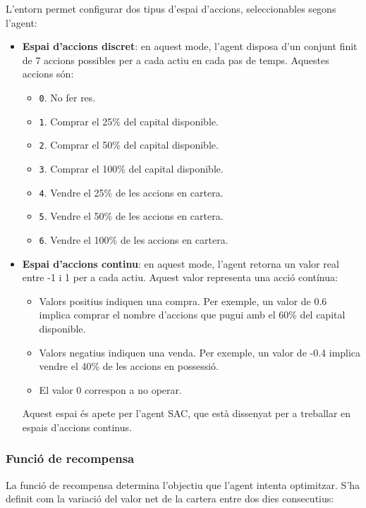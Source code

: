 \documentclass[12pt,a4paper,twoside]{book}
\begin{document}
L'entorn permet configurar dos tipus d'espai d'accions, seleccionables segons l'agent:
\begin{itemize}
    \item \textbf{Espai d'accions discret}: en aquest mode, l'agent disposa d'un conjunt finit de 7 accions possibles per a cada actiu en cada pas de temps. Aquestes accions són:
    \begin{itemize}
        \item \texttt{0}. No fer res.
        \item \texttt{1}. Comprar el 25\% del capital disponible.
        \item \texttt{2}. Comprar el 50\% del capital disponible.
        \item \texttt{3}. Comprar el 100\% del capital disponible.
        \item \texttt{4}. Vendre el 25\% de les accions en cartera.
        \item \texttt{5}. Vendre el 50\% de les accions en cartera.
        \item \texttt{6}. Vendre el 100\% de les accions en cartera.
    \end{itemize}

    \item \textbf{Espai d'accions continu}: en aquest mode, l'agent retorna un valor real entre -1 i 1 per a cada actiu. Aquest valor representa una acció contínua:
    \begin{itemize}
        \item Valors positius indiquen una compra. Per exemple, un valor de 0.6 implica comprar el nombre d'accions que pugui amb el 60\% del capital disponible.
        \item Valors negatius indiquen una venda. Per exemple, un valor de -0.4 implica vendre el 40\% de les accions en possessió.
        \item El valor 0 correspon a no operar.
    \end{itemize}
    Aquest espai és apete per l'agent SAC, que està dissenyat per a treballar en espais d'accions continus.
\end{itemize}

\subsubsection{Funció de recompensa}

La funció de recompensa determina l'objectiu que l'agent intenta optimitzar. S'ha definit com la variació del valor net de la cartera entre dos dies consecutius:
\end{document}
